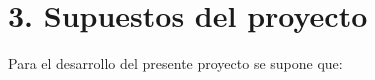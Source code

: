 \section{3. Supuestos del proyecto}
\label{sec:supuestos}


Para el desarrollo del presente proyecto se supone que: